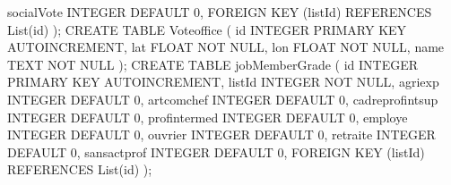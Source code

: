         socialVote INTEGER DEFAULT 0,
        \newline\indent\indent\indent
        FOREIGN KEY (listId) REFERENCES List(id)
    \newline\indent\indent
    );
\newline\newline
CREATE TABLE Vote\textunderscore office
    \newline\indent\indent
    (
        \newline\indent\indent\indent
        id INTEGER PRIMARY KEY AUTOINCREMENT,
        \newline\indent\indent\indent
        lat FLOAT NOT NULL,
        \newline\indent\indent\indent
        lon FLOAT NOT NULL,
        \newline\indent\indent\indent
        name TEXT NOT NULL
    \newline\indent\indent
    );
\newline\newline
CREATE TABLE jobMemberGrade
    \newline\indent\indent
    (
        \newline\indent\indent\indent
        id INTEGER PRIMARY KEY AUTOINCREMENT,
        \newline\indent\indent\indent
        listId INTEGER NOT NULL,
        \newline\indent\indent\indent
        agriexp INTEGER DEFAULT 0,
        \newline\indent\indent\indent
        artcomchef INTEGER DEFAULT 0,
        \newline\indent\indent\indent
        cadreprofintsup INTEGER DEFAULT 0,
        \newline\indent\indent\indent
        profintermed INTEGER DEFAULT 0,
        \newline\indent\indent\indent
        employe INTEGER DEFAULT 0,
        \newline\indent\indent\indent
        ouvrier INTEGER DEFAULT 0,
        \newline\indent\indent\indent
        retraite INTEGER DEFAULT 0,
        \newline\indent\indent\indent
        sansactprof INTEGER DEFAULT 0,
        \newline\indent\indent\indent
        FOREIGN KEY (listId) REFERENCES List(id)
    \newline\indent\indent
    );
\newline\newline

